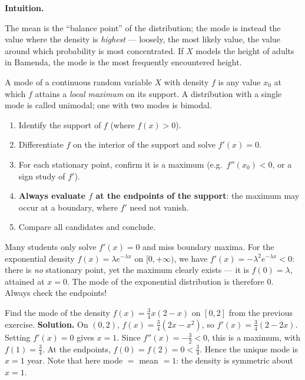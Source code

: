 \documentclass[11pt]{article}
\newcommand{\cle}[1]{{\popxbold\color{popdark}#1}}
\begin{document}
\textbf{Intuition.}\par
The mean is the ``balance point'' of the distribution; the \cle{mode} is instead the value where the density is \emph{highest} — loosely, the most likely value, the value around which probability is most concentrated. If $X$ models the height of adults in Bamenda, the mode is the most frequently encountered height.

\begin{definition}[Mode]
A \cle{mode} of a continuous random variable $X$ with density $f$ is any value $x_0$ at which $f$ attains a \emph{local maximum} on its support. A distribution with a single mode is called \cle{unimodal}; one with two modes is \cle{bimodal}.
\end{definition}

\begin{methode}
\begin{enumerate}
\item Identify the support of $f$ (where $f(x) > 0$).
\item Differentiate $f$ on the interior of the support and solve $f'(x) = 0$.
\item For each stationary point, confirm it is a maximum (e.g.\ $f''(x_0) < 0$, or a sign study of $f'$).
\item \textbf{Always evaluate $f$ at the endpoints of the support}: the maximum may occur at a boundary, where $f'$ need not vanish.
\item Compare all candidates and conclude.
\end{enumerate}
\end{methode}

\begin{attention}
Many students only solve $f'(x) = 0$ and miss boundary maxima. For the exponential density $f(x) = \lambda e^{-\lambda x}$ on $[0,+\infty)$, we have $f'(x) = -\lambda^2 e^{-\lambda x} < 0$: there is \emph{no} stationary point, yet the maximum clearly exists — it is $f(0) = \lambda$, attained at $x = 0$. The mode of the exponential distribution is therefore $0$. Always check the endpoints!
\end{attention}

\begin{exoresolu}
Find the mode of the density $f(x) = \frac34 x(2-x)$ on $[0,2]$ from the previous exercise.
\tcblower
\textbf{Solution.} On $(0,2)$, $f(x) = \frac34(2x - x^2)$, so $f'(x) = \frac34(2 - 2x)$. Setting $f'(x) = 0$ gives $x = 1$. Since $f''(x) = -\frac32 < 0$, this is a maximum, with $f(1) = \frac34$. At the endpoints, $f(0) = f(2) = 0 < \frac34$. Hence the unique mode is $x = 1$ year. Note that here mode $=$ mean $= 1$: the density is symmetric about $x = 1$.
\end{exoresolu}
\end{document}
